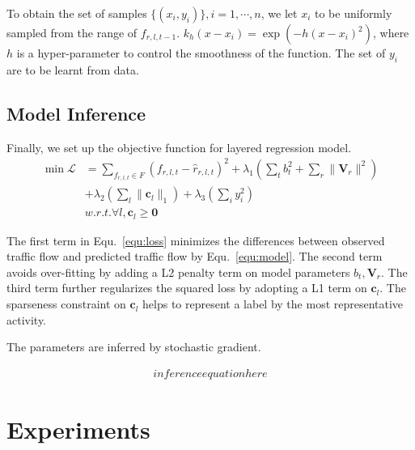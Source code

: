 \documentclass[runningheads]{llncs}
\begin{document}
To obtain the set of samples $\{(x_i,y_i)\},i=1,\cdots,n$, we let $x_i$ to be uniformly sampled from the range of $f_{r,l,t-1}$. $k_h(x-x_i)= \exp(-h (x-x_i)^2)$, where $h$ is a hyper-parameter to control the smoothness of the function. The set of $y_i$ are to be learnt from data.

\subsection{Model Inference}
Finally, we set up the objective function for layered regression model.
\begin{eqnarray}
\min \mathcal{L} & =\sum_{f_{r,l,t}\in F}(f_{r,l,t}-\hat{r}_{r,l,t})^2+\lambda_1 (\sum_t b_t^2  + \sum_r \|\mathbf{V}_r\|^2 )\\\nonumber
& +\lambda_2(\sum_l \|\mathbf{c}_l\|_1)+\lambda_3(\sum_i y_i^2)\\\nonumber
& w.r.t. \forall l, \mathbf{c}_l\geq \mathbf{0}
\label{equ:loss}
\end{eqnarray}

The first term in Equ.~\ref{equ:loss} minimizes the differences between observed traffic flow and predicted traffic flow by Equ.~\ref{equ:model}. The second term avoids over-fitting by adding a L2 penalty term on model parameters $b_t, \mathbf{V}_r$. The third term further regularizes the squared loss by adopting a L1 term on $\mathbf{c}_l$. The sparseness constraint on $\mathbf{c}_l$ helps to represent a label by the most representative activity. 

The parameters are inferred by stochastic gradient. 

\begin{eqnarray}
inference equation here
\label{equ:sgd}
\end{eqnarray}






















\section{Experiments}\label{sec:experiments}
\end{document}
